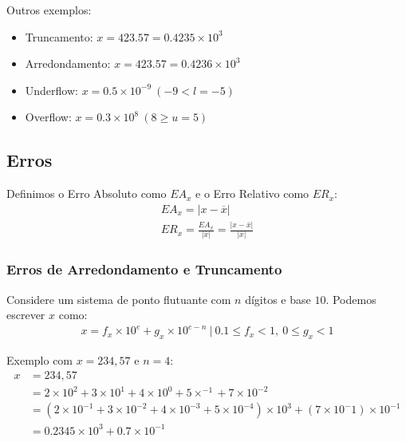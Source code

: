 \documentclass{article}
\begin{document}
        Outros exemplos:
        \begin{itemize}
            \item Truncamento: $x = 423.5\boxed{7} = 0.4235 \times 10^3$
            \item Arredondamento: $x = 423.5\boxed{7} = 0.4236 \times 10^3$
            \item Underflow: $x = 0.5 \times 10^{-9}~(-9 < l = -5)$
            \item Overflow: $x = 0.3 \times 10^8~(8 \ge u = 5)$
        \end{itemize}

    \subsection{Erros}

        Definimos o Erro Absoluto como ${EA}_x$ e o Erro Relativo como ${ER}_x$:
        \begin{gather*}
            {EA}_x = |x - \overline{x}|\\
            {ER}_x = \frac{{EA}_x}{|\overline{x}|} = \frac{|x - \overline{x}|}{|\overline{x}|}
        \end{gather*}

        \subsubsection{Erros de Arredondamento e Truncamento}

            Considere um sistema de ponto flutuante com $n$ dígitos e base $10$. Podemos escrever $x$ como:
            \begin{gather*}
                x = f_x \times 10^e + g_x \times 10^{e-n}~|~0.1 \leq f_x < 1,~ 0 \leq g_x < 1
            \end{gather*}

            Exemplo com $x=234,57$ e $n=4$:
            \begin{align*}
                x &= 234,57\\
                &= 2 \times 10^2 + 3 \times 10^1 + 4 \times 10^0 + 5 \times^{-1} + 7 \times 10^{-2}\\
                &= (2 \times 10^{-1} + 3 \times 10^{-2} + 4 \times 10^{-3} + 5 \times 10^{-4}) \times 10^3 + (7 \times 10^-1) \times 10^{-1}\\
                &= 0.2345 \times 10^{3} + 0.7 \times 10^{-1}\\
            \end{align*}
            
\end{document}
